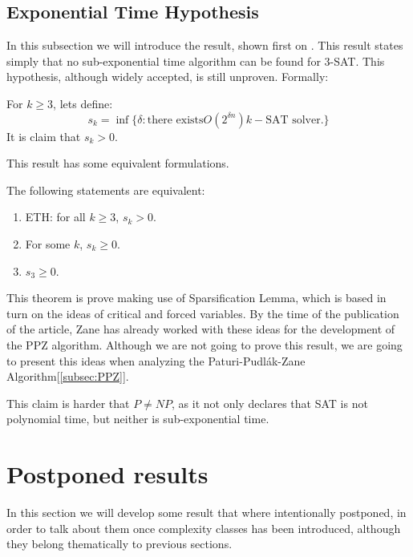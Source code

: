 \subsection{Exponential Time Hypothesis}
\label{hyp:exponential_time}
In this subsection we will introduce the result, shown first on \cite{impagliazzo2001complexity}. This result states simply that no sub-exponential time algorithm can be found for 3-SAT. This hypothesis, although widely accepted, is still unproven. Formally:

\begin{definition}[ETH]
  For $k\ge 3$, lets define:
  $$s_k=\inf\{\delta: \text{there exists} O(2^{\delta n}) k-\text{SAT solver.}\}$$
  It is claim that $s_k>0$.
\end{definition}

This result has some equivalent formulations.

\begin{proposition}
  The following statements are equivalent:
  \begin{enumerate}
  \item ETH: for all $k\ge 3$, $s_k > 0$.
  \item For some $k$, $s_k \ge 0$.
  \item $s_3 \ge 0$.

  \end{enumerate}
  \end{proposition}

This theorem is prove making use of Sparsification Lemma, which is based in turn on the ideas of critical and forced variables. By the time of the publication of the article, Zane has already worked with these ideas for the development of the PPZ algorithm\cite{paturi1997satisfiability}. Although we are not going to prove this result, we are going to present this ideas when analyzing the Paturi-Pudlák-Zane Algorithm[\ref{subsec:PPZ}].
 
This claim is harder that $P\ne NP$, as it not only declares that SAT is not polynomial time, but neither is sub-exponential time. 

\section{Postponed results}
In this section we will develop some result that where intentionally postponed, in order to talk about them once complexity classes has been introduced, although they belong thematically to previous sections. 
